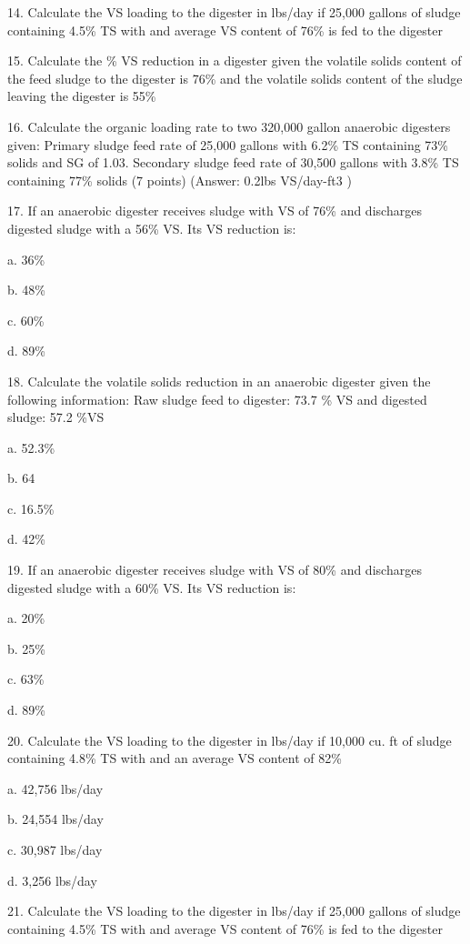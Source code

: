 \documentclass{article}
\begin{document}
14. Calculate the VS loading to the digester in lbs/day if 25,000 gallons of sludge containing 4.5\% TS with and average VS content of 76\% is fed to the digester 



15. Calculate the \% VS reduction in a digester given the volatile solids content of the feed sludge to the digester is 76\% and the volatile solids content of the sludge leaving the digester is 55\% 



16. Calculate the organic loading rate to two 320,000 gallon anaerobic digesters given:
Primary sludge feed rate of 25,000 gallons with 6.2\% TS containing 73\% solids and SG of 1.03.
Secondary sludge feed rate of 30,500 gallons with 3.8\% TS containing 77\% solids (7 points)
(Answer: 0.2lbs VS/day-ft3 ) 



17. If an anaerobic digester receives sludge with VS of 76\% and discharges digested sludge with a 56\% VS. Its VS reduction is: 

a. 36\% 

b. 48\% 

c. 60\% 

d. 89\% 


18. Calculate the volatile solids reduction in an anaerobic digester given the following information: Raw sludge feed to digester: 73.7 \% VS and digested sludge: 57.2 \%VS 

a. 52.3\% 

b. 64 

c. 16.5\% 

d. 42\% 


19. If an anaerobic digester receives sludge with VS of 80\% and discharges digested sludge with a 60\% VS. Its VS reduction is: 

a. 20\% 

b. 25\% 

c. 63\% 

d. 89\% 


20. Calculate the VS loading to the digester in lbs/day if 10,000 cu. ft of sludge containing 4.8\% TS with and an average VS content of 82\% 

a. 42,756 lbs/day 

b. 24,554 lbs/day 

c. 30,987 lbs/day 

d. 3,256 lbs/day 


21. Calculate the VS loading to the digester in lbs/day if 25,000 gallons of sludge containing 4.5\% TS with and average VS content of 76\% is fed to the digester 
\end{document}
